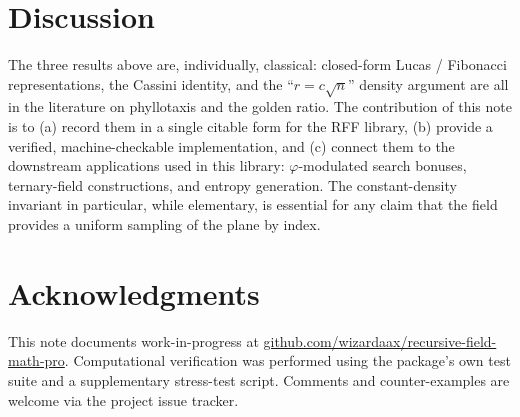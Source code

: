 \documentclass[11pt]{article}
\begin{document}
\section{Discussion}

The three results above are, individually, classical: closed-form Lucas /
Fibonacci representations, the Cassini identity, and the
``$r = c\sqrt{n}$'' density argument are all in the literature on phyllotaxis
and the golden ratio. The contribution of this note is to (a) record them
in a single citable form for the RFF library, (b) provide a verified,
machine-checkable implementation, and (c) connect them to the downstream
applications used in this library: $\varphi$-modulated search bonuses,
ternary-field constructions, and entropy generation. The constant-density
invariant in particular, while elementary, is essential for any claim that
the field provides a uniform sampling of the plane by index.

\section*{Acknowledgments}
This note documents work-in-progress at
\url{github.com/wizardaax/recursive-field-math-pro}. Computational
verification was performed using the package's own test suite and a
supplementary stress-test script. Comments and counter-examples are
welcome via the project issue tracker.
\end{document}
